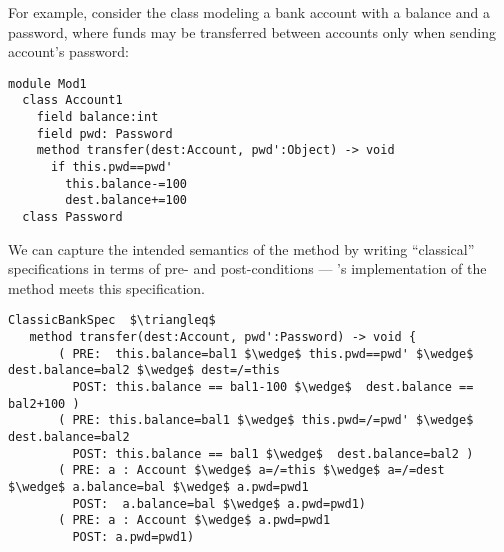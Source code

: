 


For example, consider the  class modeling a bank account
with a balance and a password, where funds may be transferred
between accounts only when sending account's password:

%
%

 
\begin{lstlisting}[language=Chainmail]
module Mod1
  class Account1
    field balance:int 
    field pwd: Password
    method transfer(dest:Account, pwd':Object) -> void
      if this.pwd==pwd'
        this.balance-=100
        dest.balance+=100
  class Password
\end{lstlisting}

\noindent 
We can capture the intended
semantics of the  method by writing ``classical''
specifications in terms of pre- and post-conditions ---
's implementation of the  method meets
this specification.



\begin{lstlisting}[mathescape=true, frame=lines, language=Chainmail]
ClassicBankSpec  $\triangleq$
   method transfer(dest:Account, pwd':Password) -> void {
       ( PRE:  this.balance=bal1 $\wedge$ this.pwd==pwd' $\wedge$ dest.balance=bal2 $\wedge$ dest=/=this 
         POST: this.balance == bal1-100 $\wedge$  dest.balance == bal2+100 )
       ( PRE: this.balance=bal1 $\wedge$ this.pwd=/=pwd' $\wedge$ dest.balance=bal2
         POST: this.balance == bal1 $\wedge$  dest.balance=bal2 )
       ( PRE: a : Account $\wedge$ a=/=this $\wedge$ a=/=dest  $\wedge$ a.balance=bal $\wedge$ a.pwd=pwd1
         POST:  a.balance=bal $\wedge$ a.pwd=pwd1)
       ( PRE: a : Account $\wedge$ a.pwd=pwd1  
         POST: a.pwd=pwd1)       
\end{lstlisting}
 
